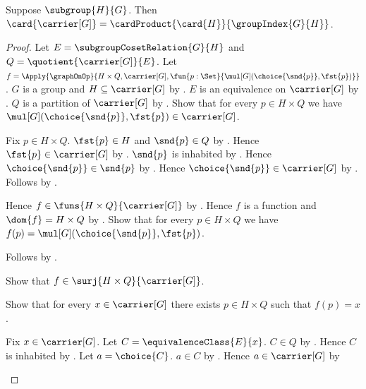 \begin{theorem}\label{group_cardinal_product_formula}
    Suppose $\subgroup{H}{G}$.
    Then
        $\card{\carrier[G]}
            =\cardProduct{\card{H}}{\groupIndex{G}{H}}$.
\end{theorem}
\begin{proof}
    Let $E=\subgroupCosetRelation{G}{H}$ and
        $Q=\quotient{\carrier[G]}{E}$.
    Let
        $f=\Apply{\graphOnOp}{
            H\times Q,\carrier[G],
            \fun{p:\Set}{
                \mul[G](\choice{\snd{p}},\fst{p})}}$.
    $G$ is a group and $H\subseteq\carrier[G]$ by
        .
    $E$ is an equivalence on $\carrier[G]$ by
        .
    $Q$ is a partition of $\carrier[G]$ by
        .
    Show that for every $p\in H\times Q$ we have
        $\mul[G](\choice{\snd{p}},\fst{p})\in\carrier[G]$.
    \begin{subproof}
        Fix $p\in H\times Q$.
        $\fst{p}\in H$ and $\snd{p}\in Q$ by
            .
        Hence $\fst{p}\in\carrier[G]$ by .
        $\snd{p}$ is inhabited by
            .
        Hence $\choice{\snd{p}}\in\snd{p}$ by .
        Hence $\choice{\snd{p}}\in\carrier[G]$ by
            .
        Follows by
            .
    \end{subproof}
    Hence $f\in\funs{H\times Q}{\carrier[G]}$ by
        .
    Hence $f$ is a function and $\dom{f}=H\times Q$ by
        .
    Show that for every $p\in H\times Q$ we have
        $f(p)=\mul[G](\choice{\snd{p}},\fst{p})$.
    \begin{subproof}
        Follows by .
    \end{subproof}
    Show that $f\in\surj{H\times Q}{\carrier[G]}$.
    \begin{subproof}
        Show that for every $x\in\carrier[G]$ there exists
            $p\in H\times Q$ such that $f(p)=x$.
        \begin{subproof}
            Fix $x\in\carrier[G]$.
            Let $C=\equivalenceClass{E}{x}$.
            $C\in Q$ by .
            Hence $C$ is inhabited by .
            Let $a=\choice{C}$.
            $a\in C$ by .
            Hence $a\in\carrier[G]$ by

\end{subproof}
\end{subproof}
\end{proof}
